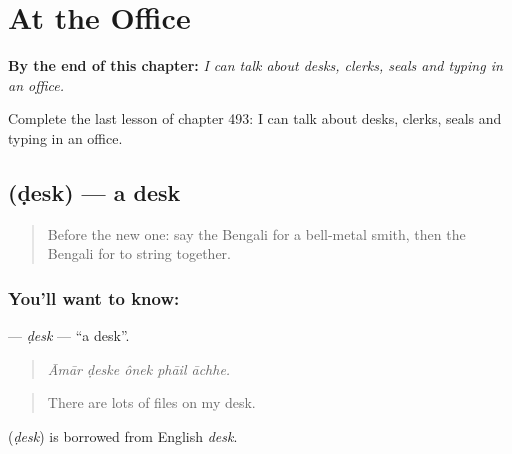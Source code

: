 
\chapter{At the Office}
\label{ch:bn-at-the-office}

\begin{chapteropening}
\textbf{By the end of this chapter:} \emph{I can talk about desks, clerks, seals and typing in an office.}

Complete the last lesson of chapter 493: I can talk about desks, clerks, seals and typing in an office.
\end{chapteropening}

\section[\texorpdfstring{\bn{ডেস্ক} (ḍesk)}{ডেস্ক (ḍesk)}]{ (ḍesk) — a desk}

\label{lesson:BN-C493-desk}



\begin{quote}
Before the new one: say the Bengali for a bell-metal smith, then the Bengali for to string together.
\end{quote}

\subsection*{You'll want to know: }
\textbf{} — \emph{ḍesk} — \textquotedblleft{}a desk\textquotedblright{}.

\begin{quote}
    
\end{quote}

\begin{quote}
\emph{Āmār ḍeske ônek phāil āchhe.}
\end{quote}

\begin{quote}
There are lots of files on my desk.
\end{quote}

\begin{cousinweb}
\textbf{} (\emph{ḍesk}) is borrowed from English \emph{desk}.
\end{cousinweb}

